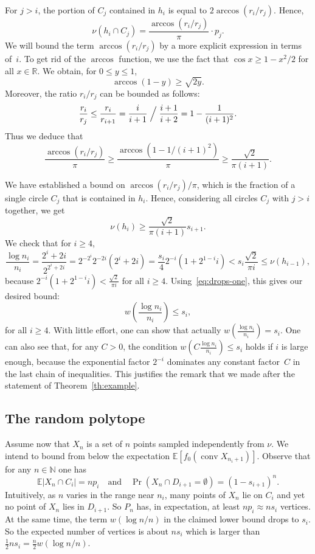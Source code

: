 \documentclass[10pt]{amsart}
\theoremstyle{definition}\newtheorem{defi}[theo]{Definition}\newtheorem{rema}[theo]{Remark}\newtheorem{exam}[theo]{Example}\newtheorem{exem}[theo]{Example}\newtheorem{nota}[theo]{Notation}
\DeclareMathOperator{\conv}{conv}
\newcommand{\wet}[1]{w(#1)}
\newcommand{\Nbb}{\mathbb{N}}%
\newcommand{\Rbb}{\mathbb{R}}%
\newcommand{\Ebb}{\mathbb{E}}%
\newcommand{\ptb}[1]{\left[#1 \right]}
\newcommand*{\mtfrac}[2]{\frac{#1}{#2}}%
\begin{document}
For $j > i$, the portion of $C_j$ contained in $h_i$ is equal to $2\arccos(r_i/r_j)$. Hence,
\[
\nu(h_i\cap C_j)=\frac{\arccos(r_i/r_j)}{\pi} \cdot p_j.
\]
We will bound the term $\arccos(r_i/r_j)$ by a more explicit expression in terms of~$i$. To get rid of the $\arccos$ function, we use the fact that $\cos x \ge 1-x^2/2$ for all $x\in\Rbb$. We obtain, for $0\le y\le1$,
\[
\arccos (1-y)\ge \sqrt{2y}.
\]
Moreover, the ratio ${r_i}/{r_{j}}$ can be bounded as follows:
\[
\frac{r_i}{r_j}\le\frac{r_i}{r_{i+1}} =\frac i{i+1} \Bigm/\frac {i+1}{i+2} = 1-\frac{1}{(i+1)^2}.
\]
Thus we deduce that
\[
\frac{\arccos(r_i/r_j)}{\pi} \ge\frac{\arccos(1- 1/{(i+1)^2})}{\pi} \ge \frac{\sqrt{2}}{\pi(i+1)}.
\]

We have established a bound on ${\arccos(r_i/r_j)}/{\pi}$, which is the fraction of a single circle $C_j$ that is contained in $h_i$. Hence, considering all circles $C_j$ with $j>i$ together, we get
\[
\nu(h_i)\ge \frac{\sqrt{2}}{\pi(i+1)}s_{i+1}.
\]
We check that for $i\ge 4$,
\[
\frac{\log n_i}{n_i}=\frac{2^{i}+2i}{2^{2^i+2i}} =2^{-2^i}2^{-2i} (2^{i}+2i) =\frac{s_i}4 2^{-i}(1+2^{1-i}i)< s_i \frac{\sqrt{2}}{\pi i}\le \nu(h_{i-1}),
\]
because $2^{-i}(1+2^{1-i}i) < \frac{\sqrt{2}}{\pi i}$ for all $i\ge 4$. Using~\eqref{eq:drops-one}, this gives our desired bound:
\[
w\left(\mtfrac{\log n_i}{n_i}\right) \le s_i,
\]
for all $i\ge 4$. With little effort, one can show that actually $\wet {\mtfrac{\log n_i}{n_i}} = s_i$. One can also see that, for any $C>0$, the condition $\wet {C\mtfrac{\log n_i}{n_i}}\le s_i $ holds if $i$ is large enough, because the exponential factor $2^{-i}$ dominates any constant factor~$C$ in the last chain of inequalities. This justifies the remark that we made after the statement of Theorem~\ref{th:example}.



\subsection{The random polytope}\label{random}

Assume now that $X_n$ is a set of $n$ points sampled independently from $\nu$. We intend to bound from below the expectation $\Ebb\ptb{f_0(\conv X_{n_i+1})}$. Observe that for any $n
\in\Nbb$ one has
\[
\Ebb|X_n\cap C_i|=np_i\quad\text{and}\quad \Pr(X_n\cap D_{i+1}=\emptyset)=(1-s_{i+1})^n.
\]
Intuitively, as $n$ varies in the range near $n_i$, many points of $X_n$ lie on $C_i$ and yet no point of $X_n$ lies in $D_{i+1}$. So $P_n$ has, in expectation, at least $np_i \approx ns_i$ vertices. At the same time, the term $\wet {\log n/n}$ in the claimed lower bound drops to $s_i$. So the expected number of vertices is about $ns_i$ which is larger than $\frac 12 ns_i=\frac n2 \wet {\log n/n}$.
\end{document}
